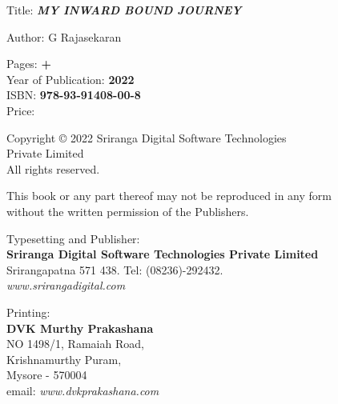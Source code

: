 \thispagestyle{empty}

\noindent
Title: {\sl\bfseries MY INWARD BOUND JOURNEY}
\medskip

\noindent
Author:  G Rajasekaran    

\vfill

\noindent
Pages: {\bf \pageref{foreword} + \pageref{bookend}}\\
Year of Publication: {\bf 2022}\\
ISBN: {\bf 978-93-91408-00-8}\\
Price: {\bf }
\vfill

\noindent
Copyright © 2022 Sriranga Digital Software Technologies\\ Private Limited\\
All rights reserved.
\vfill

\noindent
This book or any part thereof may not be reproduced in any form\\ without the written permission of the Publishers.
\vfill

\noindent
Typesetting and Publisher:\\
{\bf Sriranga Digital Software Technologies Private Limited}\\ 
Srirangapatna 571 438. Tel: (08236)-292432.\\
{\sl www.srirangadigital.com}\\
\vfill

\noindent
Printing:\\
{\bf DVK Murthy Prakashana}\\
NO 1498/1, Ramaiah Road,\\ 
Krishnamurthy Puram,\\ 
Mysore - 570004\\
email: {\sl www.dvkprakashana.com}
